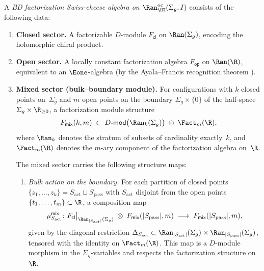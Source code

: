 \begin{definition}
\label{def:BD-SC}
A \emph{BD factorization Swiss-cheese algebra on
$\Ran^{\mathrm{oc}}_{\HT}(\Sigma_g,I)$}
consists of the following data:
\begin{enumerate}[label=\textup{(\roman*)}]
\item \textbf{Closed sector.} A factorizable $D$-module
 $F_{\mathsf{cl}}$ on $\Ran(\Sigma_g)$, encoding the
 holomorphic chiral product.

\item \textbf{Open sector.} A locally constant factorization
 algebra $F_{\mathsf{op}}$ on $\Ran(\R)$, equivalent to an
 $\Eone$-algebra (by the Ayala--Francis recognition theorem
 \cite{AF15}).

\item \textbf{Mixed sector (bulk--boundary module).} For
 configurations with $k$ closed points on~$\Sigma_g$ and $m$ open
 points on the boundary $\Sigma_g \times \{0\}$ of the half-space
 $\Sigma_g \times \R_{\geq 0}$, a factorization module structure
 \begin{equation}\label{eq:mixed-sector}
 F_{\mathsf{mix}}(k,m)
 \;\in\;
 \Dmod\bigl(\Ran_k(\Sigma_g)\bigr)
 \;\otimes\;
 \Fact_m(\R),
 \end{equation}
 where $\Ran_k$ denotes the stratum of subsets of cardinality
 exactly~$k$, and $\Fact_m(\R)$ denotes the $m$-ary component of
 the factorization algebra on~$\R$.

 The mixed sector carries the following structure maps:

 \begin{enumerate}[label=\textup{(\alph*)}]
 \item \emph{Bulk action on the boundary.} For each partition
 of closed points $\{z_1,\ldots,z_k\} = S_{\mathrm{act}} \sqcup
 S_{\mathrm{pass}}$ with $S_{\mathrm{act}}$ disjoint from
 the open points $\{t_1,\ldots,t_m\} \subset \R$, a
 composition map
 \begin{equation}\label{eq:bulk-action-composition}
 \mu^{\mathsf{mix}}_{S_{\mathrm{act}}}\colon
 F_{\mathsf{cl}}\big|_{\Ran_{|S_{\mathrm{act}}|}(\Sigma_g)}
 \;\otimes\;
 F_{\mathsf{mix}}(|S_{\mathrm{pass}}|, m)
 \;\longrightarrow\;
 F_{\mathsf{mix}}(|S_{\mathrm{pass}}|, m),
 \end{equation}
 given by the diagonal restriction
 $\Delta_{S_{\mathrm{act}}} \subset
 \Ran_{|S_{\mathrm{act}}|}(\Sigma_g) \times
 \Ran_{|S_{\mathrm{pass}}|}(\Sigma_g)$,
 tensored with the identity on $\Fact_m(\R)$.
 This map is a $D$-module morphism in the $\Sigma_g$-variables
 and respects the factorization structure on~$\R$.


\end{enumerate}
\end{enumerate}
\end{definition}
